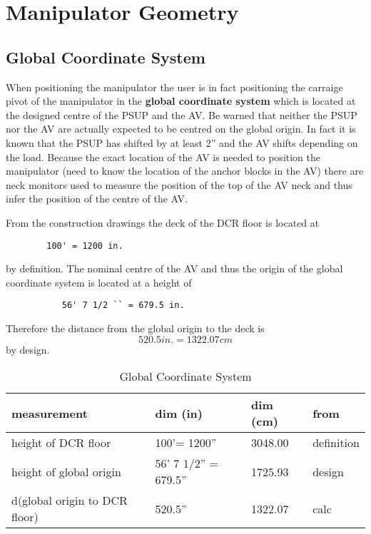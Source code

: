   
\chapter{Manipulator Geometry}
  
\section{Global Coordinate System}
  When positioning the manipulator the user is in fact positioning the
carraige pivot of the manipulator in the {\bf global coordinate system}
which is located at the designed centre of the PSUP and the AV.  Be
warned that neither the PSUP nor the AV are actually expected to be centred
on the global origin. In fact it is known that the PSUP has shifted by
at least 2'' and the AV shifts depending on the load.  Because the exact
location of the AV is needed to position the manipulator (need to know the
location of the anchor blocks in the AV) there are neck monitors used
to measure the position of the top of the AV neck and thus infer the position
of the centre of the AV.
  
  From the construction drawings the deck of the DCR
floor is located at
\begin{verbatim}
        100' = 1200 in.
\end{verbatim}
by definition.  The nominal centre of the AV 
and thus the origin of the global coordinate system is located at a height
of 
\begin{verbatim}
           56' 7 1/2 `` = 679.5 in.
\end{verbatim}
Therefore the distance from the global origin to the deck is
\[
        520.5 in. = 1322.07 cm
\]
by design.
  
\begin{table}[htbp]
\begin{center}
\begin{tabular}{|l|l|l|l|}
\hline
measurement                  & dim (in)     & dim (cm)        & from
\\ \hline
height of DCR floor          & 100'= 1200'' & 3048.00         & definition \\
height of global origin      & 56' 7 1/2'' = 679.5'' & 1725.93 & design \\
d(global origin to DCR floor)& 520.5''               & 1322.07 & calc \\
\hline
\end{tabular}
\caption[Global Coordinate System]
        {Global Coordinate System
        }
\end{center}
\end{table}
  
